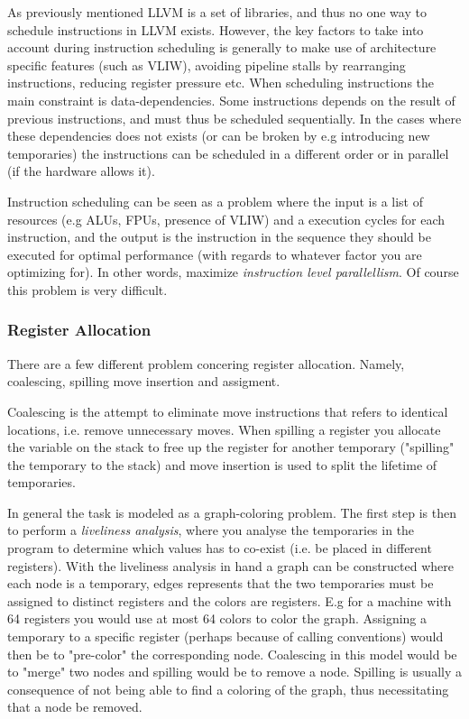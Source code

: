 
As previously mentioned LLVM is a set of libraries, and thus no one way to schedule instructions
in LLVM exists. However, the key factors to take into account during instruction scheduling
is generally to make use of architecture specific features (such as VLIW), avoiding pipeline
stalls by rearranging instructions, reducing register pressure etc. When scheduling instructions
the main constraint is data-dependencies. Some instructions depends on the result of previous
instructions, and must thus be scheduled sequentially. In the cases where these dependencies
does not exists (or can be broken by e.g introducing new temporaries) the instructions
can be scheduled in a different order or in parallel (if the hardware allows it).

Instruction scheduling can be seen as a problem where the input is a list of resources
(e.g ALUs, FPUs, presence of VLIW) and a execution cycles for each instruction, and the
output is the instruction in the sequence they should be executed for optimal performance
(with regards to whatever factor you are optimizing for). In other words, maximize \textit{
	instruction level parallellism}. Of course this problem is very difficult.

\subsubsection{Register Allocation}

There are a few different problem concering register allocation. Namely, coalescing, spilling
move insertion and assigment.

Coalescing is the attempt to eliminate move instructions that refers to identical locations,
i.e. remove unnecessary moves. When spilling a register you allocate the variable on the
stack to free up the register for another temporary ("spilling" the temporary to the stack)
and move insertion is used to split the lifetime of temporaries.

In general the task is modeled as a graph-coloring problem. The first step is then to
perform a \textit{liveliness analysis}, where you analyse the temporaries in the program
to determine which values has to co-exist (i.e. be placed in different registers). With
the liveliness analysis in hand a graph can be constructed where each node is a temporary,
edges represents that the two temporaries must be assigned to distinct registers and the
colors are registers. E.g for a machine with 64 registers you would use at most 64 colors
to color the graph. Assigning a temporary to a specific register (perhaps because of
calling conventions) would then be to "pre-color" the corresponding node. Coalescing in
this model would be to "merge" two nodes and spilling would be to remove a node. Spilling
is usually a consequence of not being able to find a coloring of the graph, thus
necessitating that a node be removed.

